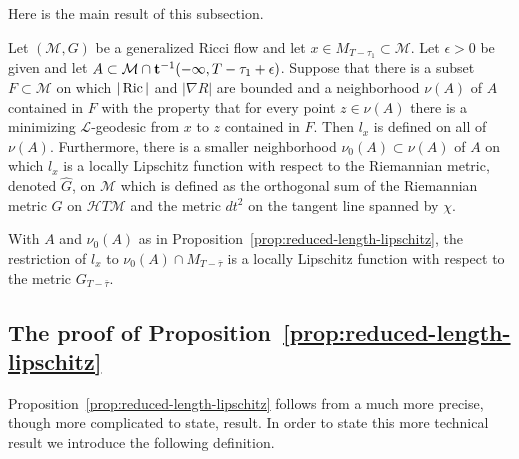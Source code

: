 Here is the main result of this subsection.

\begin{proposition}\label{prop:reduced-length-lipschitz}
\label{lips}

Let $({\mathcal M},G)$ be a generalized Ricci flow and let $x\in
M_{T-\tau_1}\subset {\mathcal M}$. Let $\epsilon>0$ be given and let $A\subset
{\mathcal M}\cap {\bf t}^{-1}(-\infty,T-\tau_1+\epsilon)$. Suppose that there
is a subset $F\subset {\mathcal M}$ on which $|\operatorname{Ric}|$ and $|\nabla R|$ are
bounded and a neighborhood $\nu(A)$ of $A$ contained in $F$ with the property
that for every point $z\in \nu(A)$ there is a minimizing ${\mathcal
L}$-geodesic from $x$ to $z$ contained in $F$. Then $l_x$ is defined on  all of
$\nu(A)$. Furthermore, there is a smaller neighborhood $\nu_0(A)\subset \nu(A)$
of $A$ on which $l_x$ is a locally Lipschitz function with respect to the
Riemannian metric, denoted $\widehat G$, on ${\mathcal M}$ which is defined as
the orthogonal sum of the Riemannian metric $G$ on ${\mathcal H}T{\mathcal M}$
and the metric $dt^2$ on the tangent line spanned by $\chi$.
\end{proposition}







\begin{corollary}\label{cor:reduced-length-lipschitz-time-slice}

With $A$ and $\nu_0(A)$ as in Proposition~\ref{prop:reduced-length-lipschitz}, the
restriction of $l_x$ to  $\nu_0(A)\cap M_{T-\bar\tau}$ is a locally
Lipschitz function with respect to the metric $G_{T-\bar\tau}$.
\end{corollary}


\subsection{The proof of Proposition~{\ref{prop:reduced-length-lipschitz}}}

Proposition~\ref{prop:reduced-length-lipschitz} follows from a much more precise, though more
complicated to state, result. In order to state this more technical
result we introduce the following definition.

